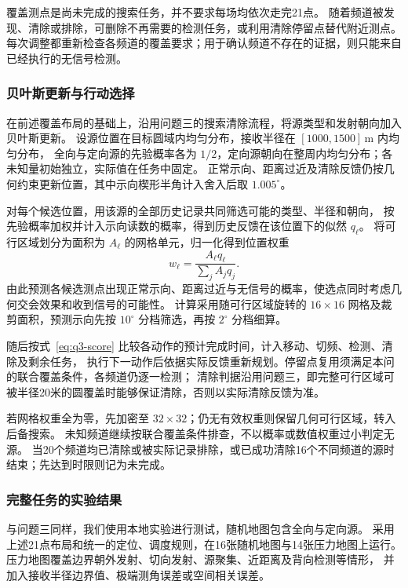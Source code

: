 \documentclass[UTF8,a4paper,12pt]{ctexart}
\begin{document}
覆盖测点是尚未完成的搜索任务，并不要求每场均依次走完21点。
随着频道被发现、清除或排除，可删除不再需要的检测任务，或利用清除停留点替代附近测点。
每次调整都重新检查各频道的覆盖要求；用于确认频道不存在的证据，则只能来自已经执行的无信号检测。

\subsubsection{贝叶斯更新与行动选择}

在前述覆盖布局的基础上，沿用问题三的搜索清除流程，将源类型和发射朝向加入贝叶斯更新。
设源位置在目标圆域内均匀分布，接收半径在 $[1000,1500]\,\mathrm m$ 内均匀分布，
全向与定向源的先验概率各为 $1/2$，定向源朝向在整周内均匀分布；各未知量初始独立，实际值在任务中固定。
正常示向、距离过近及清除反馈仍按几何约束更新位置，其中示向楔形半角计入舍入后取 $1.005^\circ$。

对每个候选位置，用该源的全部历史记录共同筛选可能的类型、半径和朝向，
按先验概率加权并计入示向读数的概率，得到历史反馈在该位置下的似然 $q_\ell$。
将可行区域划分为面积为 $A_\ell$ 的网格单元，归一化得到位置权重
\begin{equation}
  w_\ell=\frac{A_\ell q_\ell}{\sum_j A_jq_j}.
  \label{eq:q4-position-weight}
\end{equation}
由此预测各候选测点出现正常示向、距离过近与无信号的概率，使选点同时考虑几何交会效果和收到信号的可能性。
计算采用随可行区域旋转的 $16\times16$ 网格及裁剪面积，预测示向先按 $10^\circ$ 分档筛选，再按 $2^\circ$ 分档细算。

随后按式~\eqref{eq:q3-score} 比较各动作的预计完成时间，计入移动、切频、检测、清除及剩余任务，
执行下一动作后依据实际反馈重新规划。停留点复用须满足本问的联合覆盖条件，各频道仍逐一检测；
清除判据沿用问题三，即完整可行区域可被半径20米的圆覆盖时能够保证清除，否则以实际清除反馈为准。

若网格权重全为零，先加密至 $32\times32$；仍无有效权重则保留几何可行区域，转入后备搜索。
未知频道继续按联合覆盖条件排查，不以概率或数值权重过小判定无源。
当20个频道均已清除或被实际记录排除，或已成功清除16个不同频道的源时结束；先达到时限则记为未完成。

\subsubsection{完整任务的实验结果}

与问题三同样，我们使用本地实验进行测试，随机地图包含全向与定向源。
采用上述21点布局和统一的定位、调度规则，在16张随机地图与14张压力地图上运行。
压力地图覆盖边界朝外发射、切向发射、源聚集、近距离及背向检测等情形，
并加入接收半径边界值、极端测角误差或空间相关误差。
\end{document}
